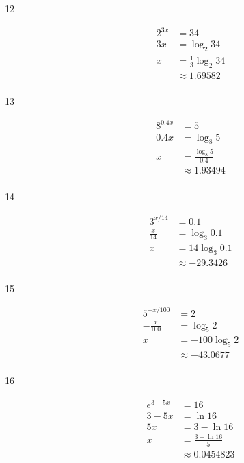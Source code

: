 \documentclass{exam}
\begin{document}
\begin{description}
      \item[12]
        \begin{align*}
          2^{3x} &= 34 \\
          3x     &= \log_2 34 \\
          x      &= \frac{1}{3} \log_2 34 \\
                 &\approx 1.69582 \\
        \end{align*}

      \item[13]
        \begin{align*}
          8^{0.4x} &= 5 \\
          0.4x &= \log_8 5 \\
          x    &= \frac{\log_8 5}{0.4} \\
               &\approx 1.93494 \\
        \end{align*}

      \item[14]
        \begin{align*}
          3^{x/14}     &= 0.1 \\
          \frac{x}{14} &= \log_3 0.1 \\
          x            &= 14 \log_3 0.1 \\
                       &\approx -29.3426 \\
        \end{align*}

      \item[15]
        \begin{align*}
          5^{-x/100}     &= 2 \\
          -\frac{x}{100} &= \log_5 2 \\
          x              &= -100 \log_5 2 \\
                         &\approx -43.0677 \\
        \end{align*}

      \item[16]
        \begin{align*}
          e^{3 - 5x} &= 16 \\
          3 - 5x     &= \ln 16 \\
          5x         &= 3 - \ln 16 \\
          x          &= \frac{3 - \ln 16}{5} \\
                     &\approx 0.0454823 \\
        \end{align*}


\end{description}
\end{document}
